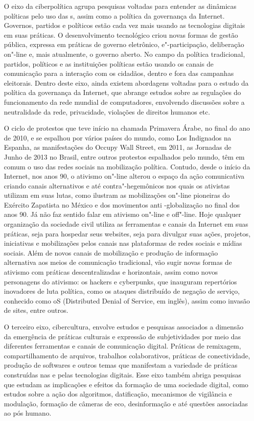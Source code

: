 O eixo da ciberpolítica agrupa pesquisas voltadas para entender as
dinâmicas políticas pelo uso das s, assim como a política da
governança da Internet. Governos, partidos e políticos estão cada vez
mais usando as tecnologias digitais em suas práticas. O desenvolvimento
tecnológico criou novas formas de gestão pública, expressa em práticas
de governo eletrônico, e"-participação, deliberação on"-line e, mais
atualmente, o governo aberto. No campo da política tradicional,
partidos, políticos e as instituições políticas estão usando os canais
de comunicação para a interação com os cidadãos, dentro e fora das
campanhas eleitorais. Dentro deste eixo, ainda existem abordagens
voltadas para o estudo da política da governança da Internet, que
abrange estudos sobre as regulações do funcionamento da rede mundial de
computadores, envolvendo discussões sobre a neutralidade da rede,
privacidade, violações de direitos humanos etc.

O ciclo de protestos que teve início na chamada Primavera Árabe, no
final do ano de 2010, e se espalhou por vários países do mundo, como Los
Indignados na Espanha, as manifestações do Occupy Wall Street, em 2011,
as Jornadas de Junho de 2013 no Brasil, entre outros protestos
espalhados pelo mundo, têm em comum o uso das redes sociais na
mobilização política. Contudo, desde o início da Internet, nos anos 90,
o ativismo on"-line alterou o espaço da ação comunicativa criando canais
alternativos e até contra"-hegemônicos nos quais os ativistas utilizam em
suas lutas, como ilustram as mobilizações on"-line pioneiras do Exército
Zapatista no México e dos movimentos anti -globalização no final dos
anos 90. Já não faz sentido falar em ativismo on"-line e off"-line. Hoje
qualquer organização da sociedade civil utiliza as ferramentas e canais
da Internet em suas práticas, seja para hospedar seus websites, seja
para divulgar suas ações, projetos, iniciativas e mobilizações pelos
canais nas plataformas de redes sociais e mídias sociais. Além de novos
canais de mobilização e produção de informação alternativa aos meios de
comunicação tradicional, vão sugir novas formas de ativismo com práticas
descentralizadas e horizontais, assim como novos personagens do
ativismo: os hackers e cyberpunks, que inauguram repertórios inovadores
de luta política, como os ataques distribuído de negação de serviço,
conhecido como oS (Distributed Denial of Service, em inglês), assim
como invasão de sites, entre outros.

O terceiro eixo, cibercultura, envolve estudos e pesquisas associados a
dimensão da emergência de práticas culturais e expressão de
subjetividades por meio das diferentes ferramentas e canais de
comunicação digital. Práticas de remixagem, compartilhamento de
arquivos, trabalhos colaborativos, práticas de conectividade, produção
de softwares e outros temas que manifestam a variedade de práticas
construídas nas e pelas tecnologias digitais. Esse eixo também abriga
pesquisas que estudam as implicações e efeitos da formação de uma
sociedade digital, como estudos sobre a ação dos algoritmos,
datificação, mecanismos de vigilância e modulação, formação de câmeras
de eco, desinformação e até questões associadas ao pós humano.

